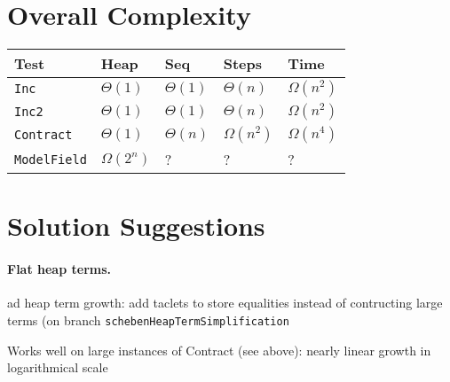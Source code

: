 \documentclass[a4paper]{article}
\begin{document}
\section{Overall Complexity}
\begin{tabular}{|l|l|l|l|l|} \hline
Test & Heap & Seq & Steps & Time \\ \hline
\texttt{Inc}& $\Theta(1)$ & $\Theta(1)$ & $\Theta(n)$ & $\Omega(n^2)$ \\
\texttt{Inc2} & $\Theta(1)$ & $\Theta(1)$ & $\Theta(n)$ & $\Omega(n^2)$ \\
\texttt{Contract} & $\Theta(1)$ & $\Theta(n)$ 
	& $\Omega(n^2)$ & $\Omega(n^4)$ \\
\texttt{ModelField} & $\Omega(2^n)$ & ? & ? & ? \\
\hline
\end{tabular}

\section{Solution Suggestions}

\paragraph{Flat heap terms.}
ad heap term growth:
	add taclets to store equalities instead of contructing large terms
	(on branch \texttt{schebenHeapTermSimplification}

Works well on large instances of Contract (see above):
 nearly linear growth in logarithmical scale
\end{document}
